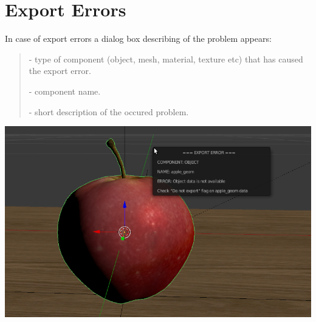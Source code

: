 \documentclass[a4paper,12pt,oneside]{sphinxmanual}
\begin{document}

\section{Export Errors}
\label{addon:export-errors}\label{addon:index-1}\label{addon:id3}
In case of export errors a  dialog box describing of the problem appears:
\begin{quote}

 - type of component (object, mesh, material, texture etc) that has caused the export error.

 - component name.

 - short description of the occured problem.
\end{quote}

{\hfill\includegraphics[width=1.000\linewidth]{error_message.jpg}\hfill}

\begin{DUlineblock}{0em}
\item[] 
\end{DUlineblock}
\end{document}
